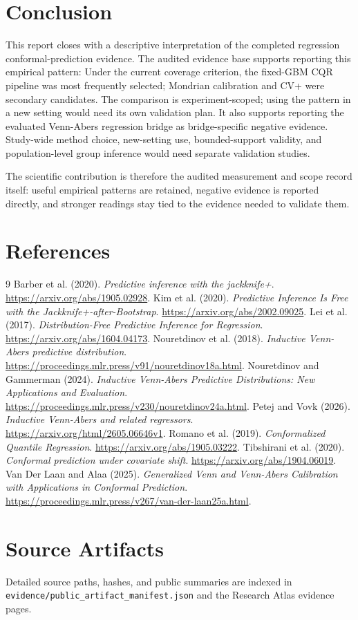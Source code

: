 \documentclass[11pt]{article}
\begin{document}
\section{Conclusion}

This report closes with a descriptive interpretation of the completed regression conformal-prediction evidence. The audited evidence base supports reporting this empirical pattern: Under the current coverage criterion, the fixed-GBM CQR pipeline was most frequently selected; Mondrian calibration and CV+ were secondary candidates. The comparison is experiment-scoped; using the pattern in a new setting would need its own validation plan. It also supports reporting the evaluated Venn-Abers regression bridge as bridge-specific negative evidence. Study-wide method choice, new-setting use, bounded-support validity, and population-level group inference would need separate validation studies.

The scientific contribution is therefore the audited measurement and scope record itself: useful empirical patterns are retained, negative evidence is reported directly, and stronger readings stay tied to the evidence needed to validate them.

\section{References}

\begin{thebibliography}{9}
 Barber et al. (2020). \emph{Predictive inference with the jackknife+}. \url{https://arxiv.org/abs/1905.02928}.
 Kim et al. (2020). \emph{Predictive Inference Is Free with the Jackknife+-after-Bootstrap}. \url{https://arxiv.org/abs/2002.09025}.
 Lei et al. (2017). \emph{Distribution-Free Predictive Inference for Regression}. \url{https://arxiv.org/abs/1604.04173}.
 Nouretdinov et al. (2018). \emph{Inductive Venn-Abers predictive distribution}. \url{https://proceedings.mlr.press/v91/nouretdinov18a.html}.
 Nouretdinov and Gammerman (2024). \emph{Inductive Venn-Abers Predictive Distributions: New Applications and Evaluation}. \url{https://proceedings.mlr.press/v230/nouretdinov24a.html}.
 Petej and Vovk (2026). \emph{Inductive Venn-Abers and related regressors}. \url{https://arxiv.org/html/2605.06646v1}.
 Romano et al. (2019). \emph{Conformalized Quantile Regression}. \url{https://arxiv.org/abs/1905.03222}.
 Tibshirani et al. (2020). \emph{Conformal prediction under covariate shift}. \url{https://arxiv.org/abs/1904.06019}.
 Van Der Laan and Alaa (2025). \emph{Generalized Venn and Venn-Abers Calibration with Applications in Conformal Prediction}. \url{https://proceedings.mlr.press/v267/van-der-laan25a.html}.
\end{thebibliography}

\section{Source Artifacts}

Detailed source paths, hashes, and public summaries are indexed in \texttt{evidence/\allowbreak{}public\_\allowbreak{}artifact\_\allowbreak{}manifest.\allowbreak{}json} and the Research Atlas evidence pages.
\end{document}
